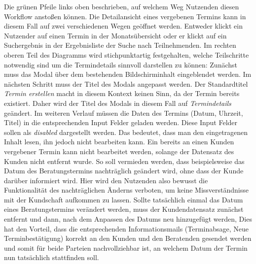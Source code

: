 \documentclass[12pt]{article}
\begin{document}
Die grünen Pfeile links oben beschrieben, auf welchem Weg Nutzenden diesen
Workflow anstoßen können. Die Detailansicht eines vergebenen Termins kann in
diesem Fall auf zwei verschiedenen Wegen geöffnet werden. Entweder klickt ein
Nutzender auf einen Termin in der Monatsübersicht oder er klickt auf ein
Suchergebnis in der Ergebnisliste der Suche nach Teilnehmenden. Im rechten
oberen Teil des Diagramms wird stichpunktartig festgehalten, welche
Teilschritte notwendig sind um die Termindetails sinnvoll darstellen zu können:
Zunächst muss das Modal über dem bestehenden
Bildschirminhalt eingeblendet werden. Im nächsten Schritt muss der Titel des
Modals angepasst werden. Der Standardtitel \textit{Termin erstellen} macht in
diesem Kontext keinen Sinn, da der Termin bereits existiert. Daher wird der
Titel des Modals in diesem Fall auf \textit{Termindetails} geändert. Im
weiteren Verlauf müssen die Daten des Termins (Datum, Uhrzeit, Titel) in die
entsprechenden Input Felder geladen werden. Diese Input Felder sollen als
\textit{disabled} dargestellt werden. Das bedeutet, dass man den eingetragenen
Inhalt lesen, ihn jedoch nicht bearbeiten kann. Ein bereits an einen Kunden
vergebener Termin kann nicht bearbeitet werden, solange der Datensatz des
Kunden nicht entfernt wurde. So soll vermieden werden, dass beispielsweise das
Datum des Beratungstermins nachträglich geändert wird, ohne dass der Kunde
darüber informiert wird. Hier wird den Nutzenden also bewusst die
Funktionalität des nachträglichen Änderns verboten, um keine Missverständnisse
mit der Kundschaft aufkommen zu lassen. Sollte tatsächlich einmal das Datum
eines Beratungstermins verändert werden, muss der Kundendatensatz zunächst
entfernt und dann, nach dem Anpassen des Datums neu hinzugefügt werden, Dies
hat den Vorteil, dass die entsprechenden Informationsmails (Terminabsage, Neue
Terminbestätigung) korrekt an den Kunden und den Beratenden gesendet werden und
somit für beide Parteien nachvollziehbar ist, an welchem Datum der Termin nun
tatsächlich stattfinden soll.
\end{document}
